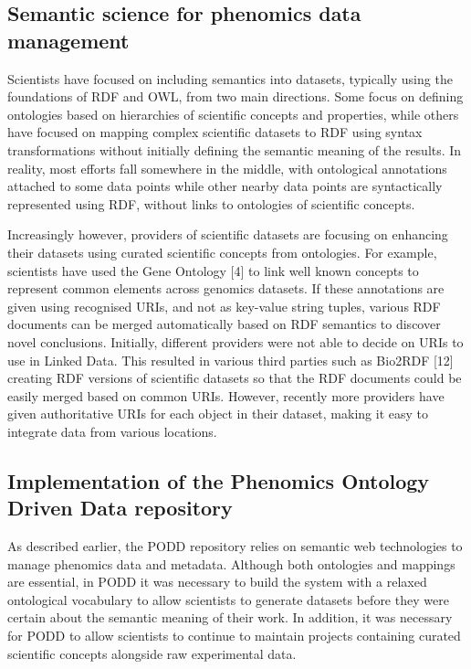 \documentclass{llncs}
\begin{document}
\subsection{Semantic science for phenomics data management}
Scientists have focused on including semantics into datasets, typically using
the foundations of RDF and OWL, from two main directions. Some focus on defining
ontologies based on hierarchies of scientific concepts and properties, while
others have focused on mapping complex scientific datasets to RDF using syntax
transformations without initially defining the semantic meaning of the results.
In reality, most efforts fall somewhere in the middle, with ontological
annotations attached to some data points while other nearby data points are
syntactically represented using RDF, without links to ontologies of scientific
concepts.


Increasingly however, providers of scientific datasets are focusing on enhancing
their datasets using curated scientific concepts from ontologies. For example,
scientists have used the Gene Ontology [4] to link well known concepts to
represent common elements across genomics datasets. If these annotations are
given using recognised URIs, and not as key-value string tuples, various RDF
documents can be merged automatically based on RDF semantics to discover novel
conclusions. Initially, different providers were not able to decide on URIs to
use in Linked Data. This resulted in various third parties such as Bio2RDF [12]
creating RDF versions of scientific datasets so that the RDF documents could be
easily merged based on common URIs. However, recently more providers have given
authoritative URIs for each object in their dataset, making it easy to integrate
data from various locations.


\subsection{Implementation of the Phenomics Ontology Driven Data repository}
As described earlier, the PODD repository relies on semantic web technologies to
manage phenomics data and metadata. Although both ontologies and mappings are
essential, in PODD it was necessary to build the system with a relaxed
ontological vocabulary to allow scientists to generate datasets before they were
certain about the semantic meaning of their work. In addition, it was necessary
for PODD to allow scientists to continue to maintain projects containing curated
scientific concepts alongside raw experimental data. 
\end{document}
